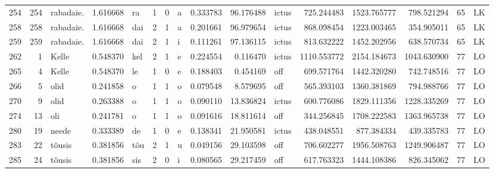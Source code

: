 \begin{tabular}{lrlrllllrrlrrrll}
254  &         254 &        rabadaie. &  1.616668 &      ra &        1 &      0 &       a &      0.333783 &     96.176488 &  ictus &   725.244483 &  1523.765777 &   798.521294 &     65 &        LK \\
258  &         258 &        rabadaie. &  1.616668 &     dai &        2 &      1 &       a &      0.201661 &     96.979654 &  ictus &   868.098454 &  1223.003465 &   354.905011 &     65 &        LK \\
259  &         259 &        rabadaie. &  1.616668 &     dai &        2 &      1 &       i &      0.111261 &     97.136115 &  ictus &   813.632222 &  1452.202956 &   638.570734 &     65 &        LK \\
262  &           1 &            Kelle &  0.548370 &     kel &        2 &      1 &       e &      0.224554 &      0.116470 &  ictus &  1110.553772 &  2154.184673 &  1043.630900 &     77 &        LO \\
265  &           4 &            Kelle &  0.548370 &      le &        1 &      0 &       e &      0.188403 &      0.454169 &    off &   699.571764 &  1442.320280 &   742.748516 &     77 &        LO \\
266  &           5 &             olid &  0.241858 &       o &        1 &      1 &       o &      0.079548 &      8.579695 &    off &   565.393103 &  1360.381869 &   794.988766 &     77 &        LO \\
270  &           9 &             olid &  0.263388 &       o &        1 &      1 &       o &      0.090110 &     13.836824 &  ictus &   600.776086 &  1829.111356 &  1228.335269 &     77 &        LO \\
274  &          13 &              oli &  0.241781 &       o &        1 &      1 &       o &      0.091616 &     18.811614 &    off &   344.256845 &  1708.222583 &  1363.965738 &     77 &        LO \\
280  &          19 &            neede &  0.333389 &      de &        1 &      0 &       e &      0.138341 &     21.950581 &  ictus &   438.048551 &   877.384334 &   439.335783 &     77 &        LO \\
283  &          22 &           tõusis &  0.381856 &     tõu &        2 &      1 &       u &      0.049156 &     29.103598 &    off &   706.602277 &  1956.508763 &  1249.906487 &     77 &        LO \\
285  &          24 &           tõusis &  0.381856 &     sis &        2 &      0 &       i &      0.080565 &     29.217459 &    off &   617.763323 &  1444.108386 &   826.345062 &     77 &        LO \\

\end{tabular}
